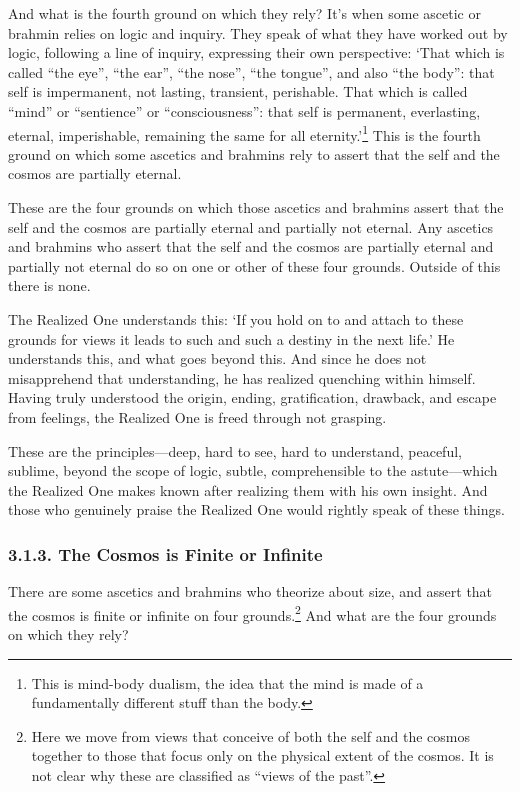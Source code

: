 \documentclass[12pt,openany]{book}%
\begin{document}
And what is the fourth ground on which they rely? It’s when some ascetic or brahmin relies on logic and inquiry. They speak of what they have worked out by logic, following a line of inquiry, expressing their own perspective: ‘That which is called “the eye”, “the ear”, “the nose”, “the tongue”, and also “the body”: that self is impermanent, not lasting, transient, perishable. That which is called “mind” or “sentience” or “consciousness”: that self is permanent, everlasting, eternal, imperishable, remaining the same for all eternity.’\footnote{This is mind-body dualism, the idea that the mind is made of a fundamentally different stuff than the body. } This is the fourth ground on which some ascetics and brahmins rely to assert that the self and the cosmos are partially eternal. 

These are the four grounds on which those ascetics and brahmins assert that the self and the cosmos are partially eternal and partially not eternal. Any ascetics and brahmins who assert that the self and the cosmos are partially eternal and partially not eternal do so on one or other of these four grounds. Outside of this there is none. 

The Realized One understands this: ‘If you hold on to and attach to these grounds for views it leads to such and such a destiny in the next life.’ He understands this, and what goes beyond this. And since he does not misapprehend that understanding, he has realized quenching within himself. Having truly understood the origin, ending, gratification, drawback, and escape from feelings, the Realized One is freed through not grasping. 

These are the principles—deep, hard to see, hard to understand, peaceful, sublime, beyond the scope of logic, subtle, comprehensible to the astute—which the Realized One makes known after realizing them with his own insight. And those who genuinely praise the Realized One would rightly speak of these things. 

\subsubsection*{3.1.3. The Cosmos is Finite or Infinite }

There are some ascetics and brahmins who theorize about size, and assert that the cosmos is finite or infinite on four grounds.\footnote{Here we move from views that conceive of both the self and the cosmos together to those that focus only on the physical extent of the cosmos. It is not  clear why these are classified as “views of the past”. } And what are the four grounds on which they rely? 
\end{document}
